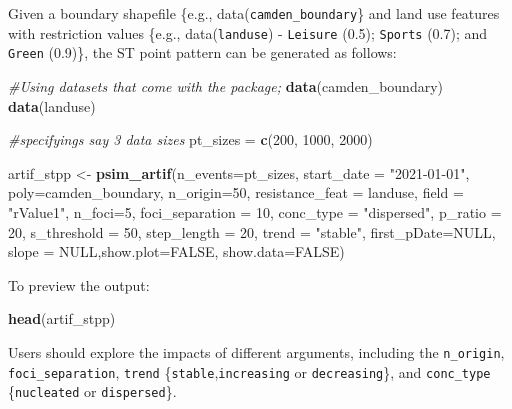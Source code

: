 \documentclass[
  16pt,
]{article}
\newenvironment{Shaded}{\begin{snugshade}}{\end{snugshade}}
\newcommand{\CommentTok}[1]{\textcolor[rgb]{0.56,0.35,0.01}{\textit{#1}}}
\newcommand{\DataTypeTok}[1]{\textcolor[rgb]{0.13,0.29,0.53}{#1}}
\newcommand{\DecValTok}[1]{\textcolor[rgb]{0.00,0.00,0.81}{#1}}
\newcommand{\KeywordTok}[1]{\textcolor[rgb]{0.13,0.29,0.53}{\textbf{#1}}}
\newcommand{\NormalTok}[1]{#1}
\newcommand{\OtherTok}[1]{\textcolor[rgb]{0.56,0.35,0.01}{#1}}
\newcommand{\StringTok}[1]{\textcolor[rgb]{0.31,0.60,0.02}{#1}}
\begin{document}
Given a boundary shapefile \{e.g., data(\texttt{camden\_boundary}\} and
land use features with restriction values \{e.g., data(\texttt{landuse})
- \texttt{Leisure} (0.5); \texttt{Sports} (0.7); and \texttt{Green}
(0.9)\}, the ST point pattern can be generated as follows:

\begin{Shaded}
\begin{Highlighting}[]
\CommentTok{\#Using datasets that come with the package;}
\KeywordTok{data}\NormalTok{(camden\_boundary)}
\KeywordTok{data}\NormalTok{(landuse)}

\CommentTok{\#specifyings say 3 data sizes}
\NormalTok{pt\_sizes =}\StringTok{ }\KeywordTok{c}\NormalTok{(}\DecValTok{200}\NormalTok{, }\DecValTok{1000}\NormalTok{, }\DecValTok{2000}\NormalTok{)}

\NormalTok{artif\_stpp <{-}}\StringTok{ }\KeywordTok{psim\_artif}\NormalTok{(}\DataTypeTok{n\_events=}\NormalTok{pt\_sizes, }\DataTypeTok{start\_date =} \StringTok{"2021{-}01{-}01"}\NormalTok{,}
  \DataTypeTok{poly=}\NormalTok{camden\_boundary, }\DataTypeTok{n\_origin=}\DecValTok{50}\NormalTok{, }\DataTypeTok{resistance\_feat =}\NormalTok{ landuse,}
  \DataTypeTok{field =} \StringTok{"rValue1"}\NormalTok{,}
  \DataTypeTok{n\_foci=}\DecValTok{5}\NormalTok{, }\DataTypeTok{foci\_separation =} \DecValTok{10}\NormalTok{, }\DataTypeTok{conc\_type =} \StringTok{"dispersed"}\NormalTok{,}
  \DataTypeTok{p\_ratio =} \DecValTok{20}\NormalTok{, }\DataTypeTok{s\_threshold =} \DecValTok{50}\NormalTok{, }\DataTypeTok{step\_length =} \DecValTok{20}\NormalTok{,}
  \DataTypeTok{trend =} \StringTok{"stable"}\NormalTok{, }\DataTypeTok{first\_pDate=}\OtherTok{NULL}\NormalTok{,}
  \DataTypeTok{slope =} \OtherTok{NULL}\NormalTok{,}\DataTypeTok{show.plot=}\OtherTok{FALSE}\NormalTok{, }\DataTypeTok{show.data=}\OtherTok{FALSE}\NormalTok{)}
\end{Highlighting}
\end{Shaded}

To preview the output:

\begin{Shaded}
\begin{Highlighting}[]
\KeywordTok{head}\NormalTok{(artif\_stpp)}
\end{Highlighting}
\end{Shaded}

Users should explore the impacts of different arguments, including the
\texttt{n\_origin}, \texttt{foci\_separation}, \texttt{trend}
\{\texttt{stable},\texttt{increasing} or \texttt{decreasing}\}, and
\texttt{conc\_type} \{\texttt{nucleated} or \texttt{dispersed}\}.
\end{document}
